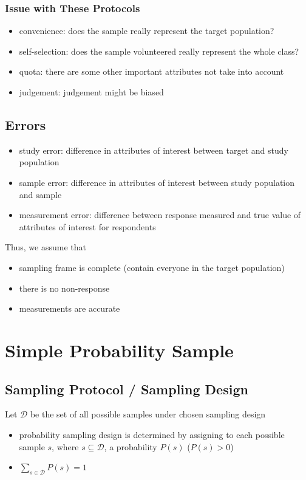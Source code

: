 \documentclass[11pt]{article}
\newcommand{\mD}{\mathcal{D}}
\newcommand{\ds}{\displaystyle}
\begin{document}
\subsubsection*{Issue with These Protocols}
\begin{itemize}
    \item convenience: does the sample really represent the target population? 
    \item self-selection: does the sample volunteered really represent the whole class?
    \item quota: there are some other important attributes not take into account
    \item judgement: judgement might be biased
\end{itemize}
\subsection{Errors}
\begin{itemize}
    \item study error: difference in attributes of interest between target and study population 
    \item sample error: difference in attributes of interest between study population and sample 
    \item measurement error: difference between response measured and true value of attributes of interest for respondents
\end{itemize}
Thus, we assume that 
\begin{itemize}
    \item sampling frame is complete (contain everyone in the target population)
    \item there is no non-response 
    \item measurements are accurate 
\end{itemize}

\section{Simple Probability Sample}
\subsection{Sampling Protocol / Sampling Design}
Let $\mD$ be the set of all possible samples under chosen sampling design 
\begin{itemize}
    \item probability sampling design is determined by assigning to each possible sample $s$, where $s\subseteq\mD$, a probability $P(s)$ ($P(s)>0$)
    \item $\ds\sum_{s\in\mD}P(s)=1$
\end{itemize}
\end{document}
